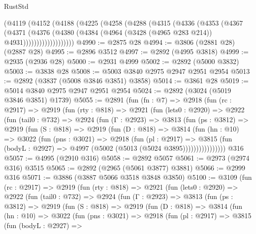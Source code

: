 \begin{lexlean}{RustStd}
\begin{coremodule}
            (@4119
              (@4152
                (@4188
                  (@4225
                    (@4258
                      (@4288
                        (@4315
                          (@4336
                            (@4353
                              (@4367
                                (@4371
                                  (@4376
                                    (@4380
                                      (@4384
                                        (@4964 (@3428 (@4965 @283 @214)) @4931)))))))))))))))))))
@4990 := @2875 @28
@4994 := @3806 (@2881 @28) (@2887 @28)
@4995 := @2896 @3512
@4997 := @2892 (@4995 @3818)
@4999 := @2935 (@2936 @28)
@5000 := @2931 @4999
@5002 := @2892 (@5000 @3832)
@5003 := @3838 @28
@5008 := @5003 @3840 @2975 @2947 @2951 @2954
@5013 := @2892 (@3837 (@5008 @3846 @3851) @3858)
@5014 := @3861 @28
@5019 := @5014 @3840 @2975 @2947 @2951 @2954
@5024 := @2892 (@3024 (@5019 @3846 @3851) @1739)
@5055 := @2891
    (fun (fn : @7) =>
    @2918
      (fun (rc : @2917) =>
      @2919
        (fun (rty : @818) =>
        @2921
          (fun (lets0 : @2920) =>
          @2922
            (fun (tail0 : @732) =>
            @2924
              (fun (Γ : @2923) =>
              @3813
                (fun (ps : @3812) =>
                @2919
                  (fun (S : @818) =>
                  @2919
                    (fun (D : @818) =>
                    @3814
                      (fun (hn : @10) =>
                      @3022
                        (fun (pns : @3021) =>
                        @2918
                          (fun (pl : @2917) =>
                          @3815
                            (fun (bodyL : @2927) => @4997 (@5002 (@5013 (@5024 @3895))))))))))))))))
    @316
@5057 := @4995 (@2910 @316)
@5058 := @2892 @5057
@5061 := @2973 (@2974 @316) @3515
@5065 := @2892 (@2965 (@5061 @3877) @3881)
@5066 := @2999 @316
@5071 := @3886 (@3887 @5066 @3518 @3848 @3850)
@5100 := @3109
    (fun (rc : @2917) =>
    @2919
      (fun (rty : @818) =>
      @2921
        (fun (lets0 : @2920) =>
        @2922
          (fun (tail0 : @732) =>
          @2924
            (fun (Γ : @2923) =>
            @3813
              (fun (ps : @3812) =>
              @2919
                (fun (S : @818) =>
                @2919
                  (fun (D : @818) =>
                  @3814
                    (fun (hn : @10) =>
                    @3022
                      (fun (pns : @3021) =>
                      @2918
                        (fun (pl : @2917) =>
                        @3815
                          (fun (bodyL : @2927) =>

\end{coremodule}
\end{lexlean}
